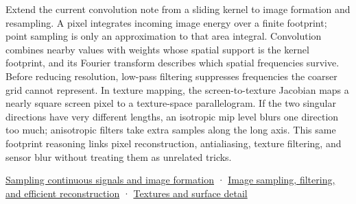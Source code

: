 Extend the current convolution note from a sliding kernel to image formation and resampling. A pixel integrates incoming image energy over a finite footprint; point sampling is only an approximation to that area integral. Convolution combines nearby values with weights whose spatial support is the kernel footprint, and its Fourier transform describes which spatial frequencies survive. Before reducing resolution, low-pass filtering suppresses frequencies the coarser grid cannot represent. In texture mapping, the screen-to-texture Jacobian maps a nearly square screen pixel to a texture-space parallelogram. If the two singular directions have very different lengths, an isotropic mip level blurs one direction too much; anisotropic filters take extra samples along the long axis. This same footprint reasoning links pixel reconstruction, antialiasing, texture filtering, and sensor blur without treating them as unrelated tricks.

\href{Continuous\%20Notes/University\%20-\%20Worlds,\%20Images\%20and\%20Inference\%20-\%20Graphics,\%20Vision\%20and\%20Photography\#Sampling\%20continuous\%20signals\%20and\%20image\%20formation}{Sampling continuous signals and image formation} · \href{Continuous\%20Notes/University\%20-\%20Worlds,\%20Images\%20and\%20Inference\%20-\%20Graphics,\%20Vision\%20and\%20Photography\#Image\%20sampling,\%20filtering,\%20and\%20efficient\%20reconstruction}{Image sampling, filtering, and efficient reconstruction} · \href{Continuous\%20Notes/University\%20-\%20Worlds,\%20Images\%20and\%20Inference\%20-\%20Graphics,\%20Vision\%20and\%20Photography\#Textures\%20and\%20surface\%20detail}{Textures and surface detail}

